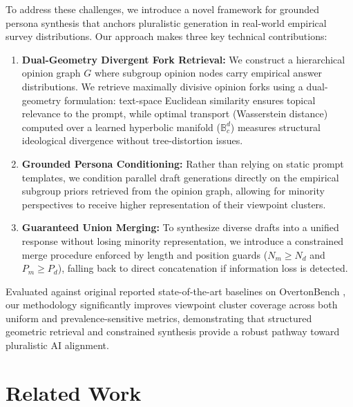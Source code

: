 \documentclass[11pt]{article}
\begin{document}
To address these challenges, we introduce a novel framework for grounded persona synthesis that anchors pluralistic generation in real-world empirical survey distributions. Our approach makes three key technical contributions:
\begin{enumerate}
    \item \textbf{Dual-Geometry Divergent Fork Retrieval:} We construct a hierarchical opinion graph $G$ where subgroup opinion nodes carry empirical answer distributions. We retrieve maximally divisive opinion forks using a dual-geometry formulation: text-space Euclidean similarity ensures topical relevance to the prompt, while optimal transport (Wasserstein distance) computed over a learned hyperbolic manifold ($\mathbb{B}^d_c$) measures structural ideological divergence without tree-distortion issues.
    \item \textbf{Grounded Persona Conditioning:} Rather than relying on static prompt templates, we condition parallel draft generations directly on the empirical subgroup priors retrieved from the opinion graph, allowing for minority perspectives to receive higher representation of their viewpoint clusters.
    \item \textbf{Guaranteed Union Merging:} To synthesize diverse drafts into a unified response without losing minority representation, we introduce a constrained merge procedure enforced by length and position guards ($N_m \ge N_d$ and $P_m \ge P_d$), falling back to direct concatenation if information loss is detected.
\end{enumerate}





Evaluated against original reported state-of-the-art baselines on OvertonBench \citep{placeholder-overtonbench}, our methodology significantly improves viewpoint cluster coverage across both uniform and prevalence-sensitive metrics, demonstrating that structured geometric retrieval and constrained synthesis provide a robust pathway toward pluralistic AI alignment.

\section{\color{red}Related Work}
\end{document}
